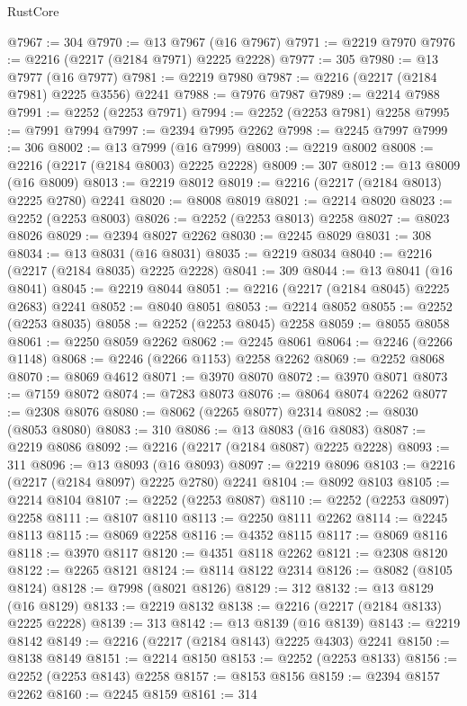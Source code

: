 \begin{lexlean}{RustCore}
\begin{coremodule}
@7967 := 304
@7970 := @13 @7967 (@16 @7967)
@7971 := @2219 @7970
@7976 := @2216 (@2217 (@2184 @7971) @2225 @2228)
@7977 := 305
@7980 := @13 @7977 (@16 @7977)
@7981 := @2219 @7980
@7987 := @2216 (@2217 (@2184 @7981) @2225 @3556) @2241
@7988 := @7976 @7987
@7989 := @2214 @7988
@7991 := @2252 (@2253 @7971)
@7994 := @2252 (@2253 @7981) @2258
@7995 := @7991 @7994
@7997 := @2394 @7995 @2262
@7998 := @2245 @7997
@7999 := 306
@8002 := @13 @7999 (@16 @7999)
@8003 := @2219 @8002
@8008 := @2216 (@2217 (@2184 @8003) @2225 @2228)
@8009 := 307
@8012 := @13 @8009 (@16 @8009)
@8013 := @2219 @8012
@8019 := @2216 (@2217 (@2184 @8013) @2225 @2780) @2241
@8020 := @8008 @8019
@8021 := @2214 @8020
@8023 := @2252 (@2253 @8003)
@8026 := @2252 (@2253 @8013) @2258
@8027 := @8023 @8026
@8029 := @2394 @8027 @2262
@8030 := @2245 @8029
@8031 := 308
@8034 := @13 @8031 (@16 @8031)
@8035 := @2219 @8034
@8040 := @2216 (@2217 (@2184 @8035) @2225 @2228)
@8041 := 309
@8044 := @13 @8041 (@16 @8041)
@8045 := @2219 @8044
@8051 := @2216 (@2217 (@2184 @8045) @2225 @2683) @2241
@8052 := @8040 @8051
@8053 := @2214 @8052
@8055 := @2252 (@2253 @8035)
@8058 := @2252 (@2253 @8045) @2258
@8059 := @8055 @8058
@8061 := @2250 @8059 @2262
@8062 := @2245 @8061
@8064 := @2246 (@2266 @1148)
@8068 := @2246 (@2266 @1153) @2258 @2262
@8069 := @2252 @8068
@8070 := @8069 @4612
@8071 := @3970 @8070
@8072 := @3970 @8071
@8073 := @7159 @8072
@8074 := @7283 @8073
@8076 := @8064 @8074 @2262
@8077 := @2308 @8076
@8080 := @8062 (@2265 @8077) @2314
@8082 := @8030 (@8053 @8080)
@8083 := 310
@8086 := @13 @8083 (@16 @8083)
@8087 := @2219 @8086
@8092 := @2216 (@2217 (@2184 @8087) @2225 @2228)
@8093 := 311
@8096 := @13 @8093 (@16 @8093)
@8097 := @2219 @8096
@8103 := @2216 (@2217 (@2184 @8097) @2225 @2780) @2241
@8104 := @8092 @8103
@8105 := @2214 @8104
@8107 := @2252 (@2253 @8087)
@8110 := @2252 (@2253 @8097) @2258
@8111 := @8107 @8110
@8113 := @2250 @8111 @2262
@8114 := @2245 @8113
@8115 := @8069 @2258
@8116 := @4352 @8115
@8117 := @8069 @8116
@8118 := @3970 @8117
@8120 := @4351 @8118 @2262
@8121 := @2308 @8120
@8122 := @2265 @8121
@8124 := @8114 @8122 @2314
@8126 := @8082 (@8105 @8124)
@8128 := @7998 (@8021 @8126)
@8129 := 312
@8132 := @13 @8129 (@16 @8129)
@8133 := @2219 @8132
@8138 := @2216 (@2217 (@2184 @8133) @2225 @2228)
@8139 := 313
@8142 := @13 @8139 (@16 @8139)
@8143 := @2219 @8142
@8149 := @2216 (@2217 (@2184 @8143) @2225 @4303) @2241
@8150 := @8138 @8149
@8151 := @2214 @8150
@8153 := @2252 (@2253 @8133)
@8156 := @2252 (@2253 @8143) @2258
@8157 := @8153 @8156
@8159 := @2394 @8157 @2262
@8160 := @2245 @8159
@8161 := 314

\end{coremodule}
\end{lexlean}
